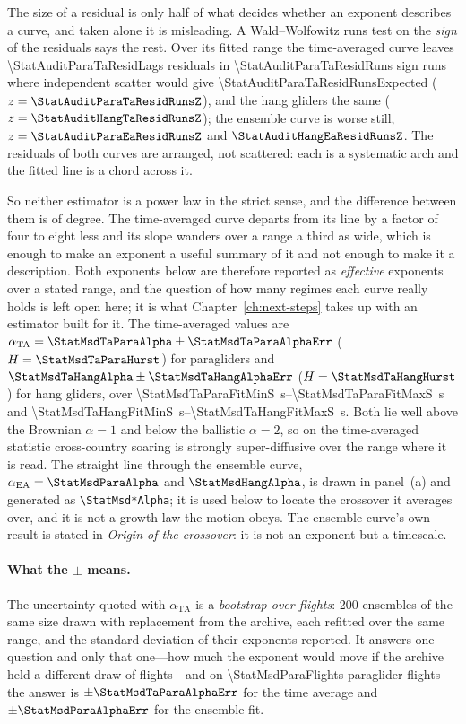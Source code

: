 \begin{revblock}
The size of a residual is only half of what decides whether an exponent describes a curve,
and taken alone it is misleading. A Wald--Wolfowitz runs test on the \emph{sign} of the
residuals says the rest. Over its fitted range the time-averaged curve leaves
\num{\StatAuditParaTaResidLags} residuals in \num{\StatAuditParaTaResidRuns} sign runs
where independent scatter would give \num{\StatAuditParaTaResidRunsExpected}
($z=\StatAuditParaTaResidRunsZ$), and the hang gliders the same
($z=\StatAuditHangTaResidRunsZ$); the ensemble curve is worse still,
$z=\StatAuditParaEaResidRunsZ$ and $\StatAuditHangEaResidRunsZ$. The residuals of both
curves are arranged, not scattered: each is a systematic arch and the fitted line is a
chord across it.

So neither estimator is a power law in the strict sense, and the difference between them is
of degree. The time-averaged curve departs from its line by a factor of four to eight less
and its slope wanders over a range a third as wide, which is enough to make an exponent a
useful summary of it and not enough to make it a description. Both exponents below are
therefore reported as \emph{effective} exponents over a stated range, and the question of
how many regimes each curve really holds is left open here; it is what
Chapter~\ref{ch:next-steps} takes up with an estimator built for it. The time-averaged
values are
$\alpha_{\mathrm{TA}}=\StatMsdTaParaAlpha\pm\StatMsdTaParaAlphaErr$
($H=\StatMsdTaParaHurst$) for paragliders and
$\StatMsdTaHangAlpha\pm\StatMsdTaHangAlphaErr$ ($H=\StatMsdTaHangHurst$) for hang gliders,
over \SIrange{\StatMsdTaParaFitMinS}{\StatMsdTaParaFitMaxS}{\second} and
\SIrange{\StatMsdTaHangFitMinS}{\StatMsdTaHangFitMaxS}{\second}. Both lie well above the
Brownian $\alpha=1$ and below the ballistic $\alpha=2$, so on the time-averaged statistic
cross-country soaring is strongly super-diffusive over the range where it is read. The straight line through the ensemble curve,
$\alpha_{\mathrm{EA}}=\StatMsdParaAlpha$ and $\StatMsdHangAlpha$, is drawn in panel~(a)
and generated as \texttt{\textbackslash StatMsd*Alpha}; it is used below to locate the
crossover it averages over, and it is not a growth law the motion obeys. The ensemble
curve's own result is stated in \emph{Origin of the crossover}: it is not an exponent but
a timescale.

\paragraph{What the $\pm$ means.}
The uncertainty quoted with $\alpha_{\mathrm{TA}}$ is a \emph{bootstrap over flights}:
\num{200} ensembles of the same size drawn with replacement from the archive, each
refitted over the same range, and the standard deviation of their exponents reported. It
answers one question and only that one---how much the exponent would move if the archive
held a different draw of flights---and on \num{\StatMsdParaFlights} paraglider flights the
answer is $\pm\StatMsdTaParaAlphaErr$ for the time average and
$\pm\StatMsdParaAlphaErr$ for the ensemble fit.


\end{revblock}
